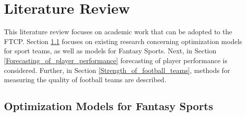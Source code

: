 
\chapter{Literature Review}
This literature review focuses on academic work that can be adopted to the FTCP. Section \ref{Opt_Models_for_Fantasy_Sports} focuses on existing research concerning optimization models for sport teams, as well as models for Fantasy Sports. Next, in Section \ref{Forecasting_of_player_performance} forecasting of player performance is considered. Further, in Section \ref{Strength_of_football_teams}, methods for measuring the quality of football teams are described.




\section{Optimization Models for Fantasy Sports} \label{Opt_Models_for_Fantasy_Sports}

\begin{comment}


- skrive generelt om hvordan optimering er i fantasy verdenen. Er det noe som er mye brukt, hvilke type fantasy er det mye brukt? har det vært en stor suksess? 

\begin{enumerate}
    \item \textbf{MathSport2013Proceedings.pdf(side 21-29)}. Artikkel som handler generelt om fantasy sport games- 
    \item \textbf{Optimizing Tiered Daily fantasy sports –Mathematically Modeling DraftKings® NFL Millionaire Maker Tournament}. Artikkel som handler om NFL. Her snakker de også om varians.
    \item \textbf{Mathematical programming as a tool for virtual soccer coaches: a case study of a fantasy sport game}. Artikkel om argentinsk liga. 
    \item \textbf{Matthews et al(2012)}. Artikkel som bruker Bayesian Q-learning på FPL.
    \item Hvor kommer Fry og Gibson inn, og trenger man dem? 
\end{enumerate}
\end{comment}

